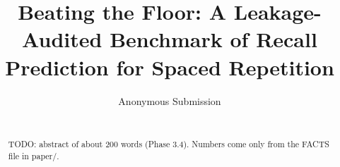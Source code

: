 \documentclass{edm_article}
\title{Beating the Floor: A Leakage-Audited Benchmark of Recall Prediction for Spaced Repetition}
\author{
\alignauthor
Anonymous Submission\\
\affaddr{Anonymous Affiliation}\\
\email{anonymous@anonymous.edu}
}
\begin{document}
\maketitle

\begin{abstract}
TODO: abstract of about 200 words (Phase 3.4). Numbers come only from the FACTS file in paper/.
\end{abstract}













\end{document}
